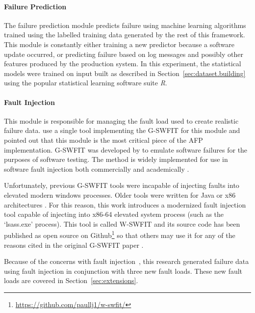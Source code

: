 \paragraph{Failure Prediction} \label{sec:failurePrediction} %
The failure prediction module predicts failure using machine learning
algorithms trained using the labelled training data generated by the rest of
this framework.  This module is constantly either training a new predictor
because a software update occurred, or predicting failure based on log messages
and possibly other features produced by the production system.  In this
experiment, the statistical models were trained on input built as described in
Section~\ref{sec:dataset.building} using the popular statistical learning
software suite \emph{R}.

\paragraph{Fault Injection} \label{sec:faultInjectionMgr}
This module is responsible for managing the fault load used to create realistic
failure data.  \citet{irrera2015} use a single tool implementing the
\ac{G-SWFIT} for this module and pointed out that this module is the most
critical piece of the \ac{AFP} implementation.  \ac{G-SWFIT} was developed by
\citet{gswfit} to emulate software failures for the purposes of software
testing.  The method is widely implemented for use in software fault injection
both commercially and academically
\citep{cotroneo2012,irrera2014,natella2010,umadevi2015}. 

Unfortunately, previous \ac{G-SWFIT} tools were incapable of injecting faults
into elevated modern windows processes.  Older tools were written for Java or
x86 architectures \citep{gswfit,martins2002jaca,natella2010,sanches2011jswfit}.
For this reason, this work introduces a modernized fault injection tool capable
of injecting into x86-64 elevated system process (such as the `lsass.exe'
process).  This tool is called \ac{W-SWFIT} and its source code has been
published as open source on
Github\footnote{\url{https://github.com/paullj1/w-swfit/}} so that others may
use it for any of the reasons cited in the original \ac{G-SWFIT} paper
\citep{gswfit}.

Because of the concerns with fault
injection~\citep{cotroneo2012,kikuchi2014,natella2010}, this research generated
failure data using fault injection in conjunction with three new fault loads.
These new fault loads are covered in Section~\ref{sec:extensions}.

